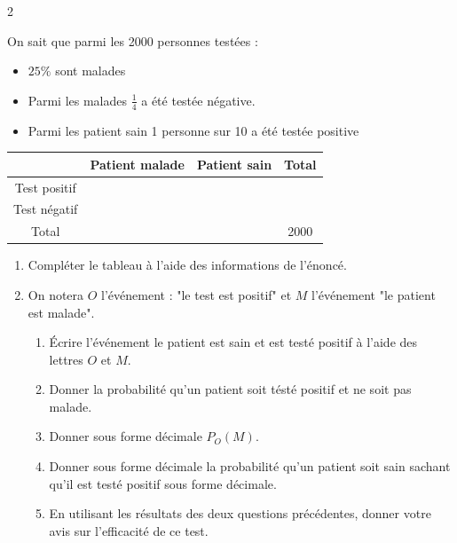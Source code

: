 \documentclass[10pt,a4paper]{article}
\begin{document}
\begin{multicols}{2}
\begin{exo}[][bac]
On sait que parmi les 2000 personnes testées : 

\begin{itemize}
    \item \(25\%\) sont malades
    \item Parmi les malades \(\frac{1}{4}\) a été testée négative.
    \item Parmi les patient sain 1 personne sur 10 a été testée positive
\end{itemize}   

\bigskip


 \begin{tabular}{|c|c|c|c|}
    \hline
    & Patient malade & Patient sain &Total\\
    \hline
    Test positif &  & & \\
    \hline
    Test négatif &  &  &  \\
    \hline
    Total &  &  & 2000\\
    \hline
    \end{tabular}

\bigskip

\begin{enumerate}
    \item Compléter le tableau à l'aide des informations de l'énoncé.
    \item On notera \(O\) l'événement : "le test est positif" et \(M\) l'événement "le patient est malade". 
    
    \begin{enumerate}
        \item Écrire l'événement le patient est sain et est testé positif à l'aide des lettres \(O\) et \(M\).
        \item Donner la probabilité qu'un patient soit tésté positif et ne soit pas malade.
        \item Donner sous forme décimale \(P_O(M)\).
        \item Donner sous forme décimale la probabilité qu'un patient soit sain sachant qu'il est testé positif sous forme décimale.
        \item En utilisant les résultats des deux questions précédentes, donner votre avis sur l'efficacité de ce test.
    \end{enumerate}

\end{enumerate}
\end{exo}


\begin{exo}


\end{exo}
\end{multicols}
\end{document}
